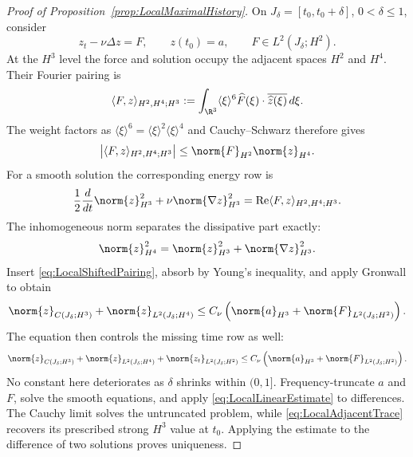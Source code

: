 \begin{proof}[Proof of Proposition~\ref{prop:LocalMaximalHistory}]
On \(J_\delta=[t_0,t_0+\delta]\), \(0<\delta\leq1\), consider
\[
  z_t-\nu\Delta z=F,
  \qquad
  z(t_0)=a,
  \qquad
  F\in L^2(J_\delta;H^2).
\]
At the \(H^3\) level the force and solution occupy the adjacent spaces
\(H^2\) and \(H^4\).  Their Fourier pairing is
\[
  \langle F,z\rangle_{H^2,H^4;H^3}
  :=\int_{\R^3}\langle\xi\rangle^6
       \widehat F(\xi)\cdot\overline{\widehat z(\xi)}\,d\xi.
\]
The weight factors as
\(
  \langle\xi\rangle^6
  =\langle\xi\rangle^2\langle\xi\rangle^4
\)
and Cauchy--Schwarz therefore gives
\begin{equation}
  \left|\langle F,z\rangle_{H^2,H^4;H^3}\right|
  \leq\norm{F}_{H^2}\norm{z}_{H^4}.
  \label{eq:LocalShiftedPairing}
\end{equation}
For a smooth solution the corresponding energy row is
\[
  \frac12\frac d{dt}\norm{z}_{H^3}^2
  +\nu\norm{\nabla z}_{H^3}^2
  =\operatorname{Re}\langle F,z\rangle_{H^2,H^4;H^3}.
\]
The inhomogeneous norm separates the dissipative part exactly:
\[
  \norm{z}_{H^4}^2
  =\norm{z}_{H^3}^2+\norm{\nabla z}_{H^3}^2.
\]
Insert \eqref{eq:LocalShiftedPairing}, absorb by Young’s inequality, and apply
Gronwall to obtain
\[
  \norm{z}_{C(J_\delta;H^3)}
  +\norm{z}_{L^2(J_\delta;H^4)}
  \leq
  C_\nu\left(
    \norm{a}_{H^3}+\norm{F}_{L^2(J_\delta;H^2)}
  \right).
\]
The equation then controls the missing time row as well:
\begin{equation}
  \norm{z}_{C(J_\delta;H^3)}
  +\norm{z}_{L^2(J_\delta;H^4)}
  +\norm{z_t}_{L^2(J_\delta;H^2)}
  \leq
  C_\nu\left(
    \norm{a}_{H^3}+\norm{F}_{L^2(J_\delta;H^2)}
  \right).
  \label{eq:LocalLinearEstimate}
\end{equation}
No constant here deteriorates as \(\delta\) shrinks within \((0,1]\).
Frequency-truncate \(a\) and \(F\), solve the smooth equations, and apply
\eqref{eq:LocalLinearEstimate} to differences.  The Cauchy limit solves the
untruncated problem, while \eqref{eq:LocalAdjacentTrace} recovers its prescribed
strong \(H^3\) value at \(t_0\).  Applying the estimate to the difference of two
solutions proves uniqueness.



\end{proof}

